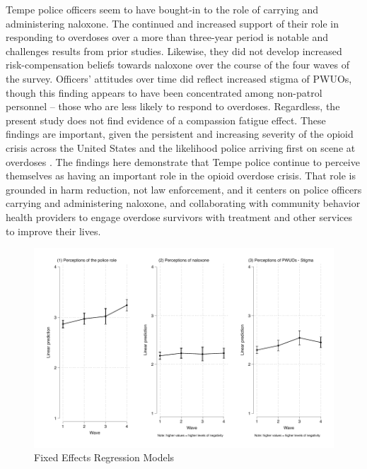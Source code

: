 Tempe police officers seem to have bought-in to the role of carrying and administering naloxone. The continued and increased support of their role in responding to overdoses over a more than three-year period is notable and challenges results from prior studies. Likewise, they did not develop increased risk-compensation beliefs towards naloxone over the course of the four waves of the survey.  Officers’ attitudes over time did reflect increased stigma of PWUOs, though this finding appears to have been concentrated among non-patrol personnel – those who are less likely to respond to overdoses. Regardless, the present study does not find evidence of a compassion fatigue effect. These findings are important, given the persistent and increasing severity of the opioid crisis across the United States and the likelihood police arriving first on scene at overdoses \parencite{white_leveraging_2022}. The findings here demonstrate  that Tempe police continue to perceive themselves as having an important role in the opioid overdose crisis. That role is grounded in harm reduction, not law enforcement, and it centers on police officers carrying and administering naloxone, and collaborating with community behavior health providers to engage overdose survivors with treatment and other services to improve their lives.  


\pagebreak


\begin{landscape}

\end{landscape}


\begin{figure}
    \centering
    \caption{\centering Fixed Effects Regression Models}
    \includegraphics{figures/growth_models.pdf}
\end{figure}


